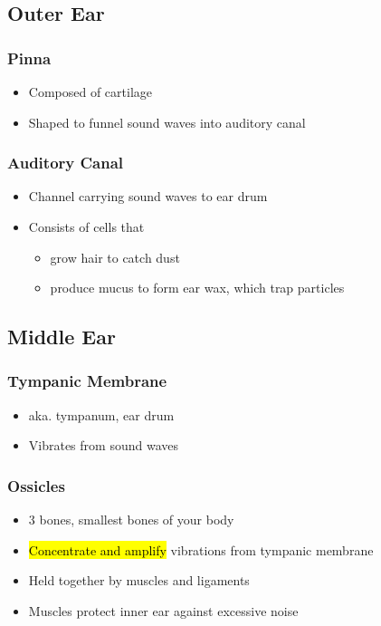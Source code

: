\documentclass[a4paper,12pt]{article}
\begin{document}
\subsection{Outer Ear}

\subsubsection{Pinna}
\begin{itemize}
    \item{Composed of cartilage}
    \item{Shaped to funnel sound waves into auditory canal}
\end{itemize}

\subsubsection{Auditory Canal}
\begin{itemize}
    \item{Channel carrying sound waves to ear drum}
    \item{
            Consists of cells that
            \begin{itemize}
                \item{grow hair to catch dust}
                \item{produce mucus to form ear wax, which trap particles}
            \end{itemize}
        }
\end{itemize}

\pagebreak

\subsection{Middle Ear}

\subsubsection{Tympanic Membrane}
\begin{itemize}
    \item{aka. tympanum, ear drum}
    \item{Vibrates from sound waves}
\end{itemize}

\subsubsection{Ossicles}
\begin{itemize}
    \item{3 bones, smallest bones of your body}
    \item{\hl{Concentrate and amplify} vibrations from tympanic membrane}
    \item{Held together by muscles and ligaments}
    \item{Muscles protect inner ear against excessive noise}
\end{itemize}
\end{document}
